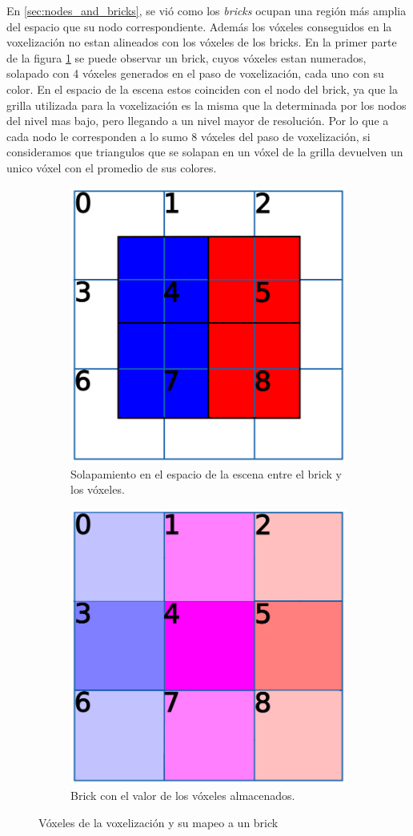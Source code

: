 En \ref{sec:nodes_and_bricks}, se vió como los \textit{bricks} ocupan una región más amplia del espacio que su nodo correspondiente.
Además los vóxeles conseguidos en la voxelización no estan alineados con los vóxeles de los bricks.
En la primer parte de la figura \ref{fig:voxels-to-bricks} se puede observar un brick, cuyos vóxeles estan numerados, solapado con 4 vóxeles generados en el paso de voxelización, cada uno con su color.
En el espacio de la escena estos coinciden con el nodo del brick, ya que la grilla utilizada para la voxelización es la misma que la determinada por los nodos del nivel mas bajo, pero llegando a un nivel mayor de resolución.
Por lo que a cada nodo le corresponden a lo sumo 8 vóxeles del paso de voxelización, si consideramos que triangulos que se solapan en un vóxel de la grilla devuelven un unico vóxel con el promedio de sus colores.

\begin{figure}[ht]
    \begin{subfigure}{.49\textwidth}
        \centering
        \includegraphics[width=.5\textwidth]{voxels-to-bricks.png}
        \caption{Solapamiento en el espacio de la escena entre el brick y los vóxeles.}
    \end{subfigure}
    \begin{subfigure}{.49\textwidth}
        \centering
        \includegraphics[width=.5\textwidth]{voxels-to-bricks-b.png}
        \caption{Brick con el valor de los vóxeles almacenados.}
    \end{subfigure}
    \caption{Vóxeles de la voxelización y su mapeo a un brick}
    \label{fig:voxels-to-bricks}
\end{figure}

